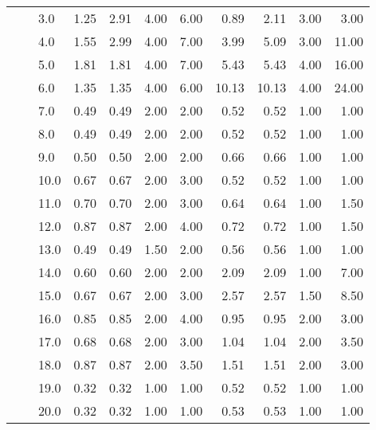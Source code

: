 \begin{tabular}{lllrrrrrrrr}
       &     & 3.0  &       1.25 &      2.91 &  4.00 &   6.00 &       0.89 &      2.11 &  3.00 &   3.00 \\
       &     & 4.0  &       1.55 &      2.99 &  4.00 &   7.00 &       3.99 &      5.09 &  3.00 &  11.00 \\
       &     & 5.0  &       1.81 &      1.81 &  4.00 &   7.00 &       5.43 &      5.43 &  4.00 &  16.00 \\
       &     & 6.0  &       1.35 &      1.35 &  4.00 &   6.00 &      10.13 &     10.13 &  4.00 &  24.00 \\
       &     & 7.0  &       0.49 &      0.49 &  2.00 &   2.00 &       0.52 &      0.52 &  1.00 &   1.00 \\
       &     & 8.0  &       0.49 &      0.49 &  2.00 &   2.00 &       0.52 &      0.52 &  1.00 &   1.00 \\
       &     & 9.0  &       0.50 &      0.50 &  2.00 &   2.00 &       0.66 &      0.66 &  1.00 &   1.00 \\
       &     & 10.0 &       0.67 &      0.67 &  2.00 &   3.00 &       0.52 &      0.52 &  1.00 &   1.00 \\
       &     & 11.0 &       0.70 &      0.70 &  2.00 &   3.00 &       0.64 &      0.64 &  1.00 &   1.50 \\
       &     & 12.0 &       0.87 &      0.87 &  2.00 &   4.00 &       0.72 &      0.72 &  1.00 &   1.50 \\
       &     & 13.0 &       0.49 &      0.49 &  1.50 &   2.00 &       0.56 &      0.56 &  1.00 &   1.00 \\
       &     & 14.0 &       0.60 &      0.60 &  2.00 &   2.00 &       2.09 &      2.09 &  1.00 &   7.00 \\
       &     & 15.0 &       0.67 &      0.67 &  2.00 &   3.00 &       2.57 &      2.57 &  1.50 &   8.50 \\
       &     & 16.0 &       0.85 &      0.85 &  2.00 &   4.00 &       0.95 &      0.95 &  2.00 &   3.00 \\
       &     & 17.0 &       0.68 &      0.68 &  2.00 &   3.00 &       1.04 &      1.04 &  2.00 &   3.50 \\
       &     & 18.0 &       0.87 &      0.87 &  2.00 &   3.50 &       1.51 &      1.51 &  2.00 &   3.00 \\
       &     & 19.0 &       0.32 &      0.32 &  1.00 &   1.00 &       0.52 &      0.52 &  1.00 &   1.00 \\
       &     & 20.0 &       0.32 &      0.32 &  1.00 &   1.00 &       0.53 &      0.53 &  1.00 &   1.00 \\

\end{tabular}
